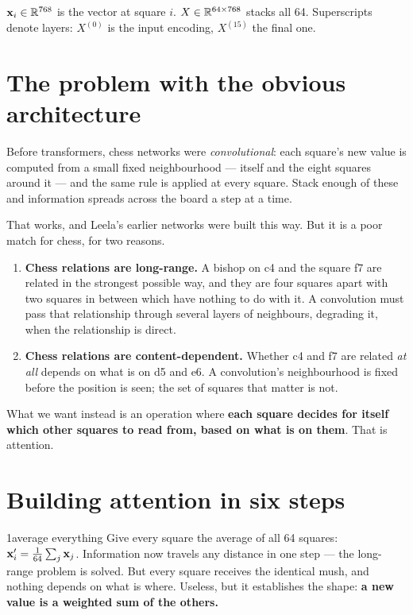\begin{notationbox}
$\mathbf{x}_i \in \mathbb{R}^{768}$ is the vector at square $i$. $X \in \mathbb{R}^{64\times768}$ stacks all 64.
Superscripts denote layers: $X^{(0)}$ is the input encoding, $X^{(15)}$ the final one.
\end{notationbox}

\section{The problem with the obvious architecture}

Before transformers, chess networks were \emph{convolutional}: each square's new value is
computed from a small fixed neighbourhood --- itself and the eight squares around it --- and
the same rule is applied at every square. Stack enough of these and information spreads
across the board a step at a time.

That works, and Leela's earlier networks were built this way. But it is a poor match for
chess, for two reasons.

\begin{enumerate}
\item \textbf{Chess relations are long-range.} A bishop on c4 and the square f7 are related in
  the strongest possible way, and they are four squares apart with two squares in between
  which have nothing to do with it. A convolution must pass that relationship through several
  layers of neighbours, degrading it, when the relationship is direct.
\item \textbf{Chess relations are content-dependent.} Whether c4 and f7 are related \emph{at
  all} depends on what is on d5 and e6. A convolution's neighbourhood is fixed before the
  position is seen; the set of squares that matter is not.
\end{enumerate}

What we want instead is an operation where \textbf{each square decides for itself which other
squares to read from, based on what is on them}. That is attention.

\section{Building attention in six steps}

\begin{attempt}{1}{average everything}
Give every square the average of all 64 squares:
$\mathbf{x}_i' = \frac{1}{64}\sum_j \mathbf{x}_j$.
Information now travels any distance in one step --- the long-range problem is solved. But
every square receives the identical mush, and nothing depends on what is where. Useless, but
it establishes the shape: \textbf{a new value is a weighted sum of the others.}
\end{attempt}

